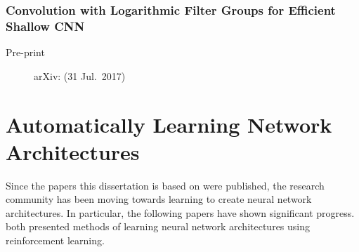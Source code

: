\documentclass[thesis]{subfiles}
\begin{document}
\subsubsection*{Convolution with Logarithmic Filter Groups for Efficient Shallow {CNN}}
\begin{description}
    \item[Pre-print] arXiv: (31 Jul.\ 2017)
\end{description}
\citet{Lee2017}

\section[Automatically Learning Network Architectures]{Automatically Learning Network\texorpdfstring{\\}{ }Architectures}
Since the papers this dissertation is based on were published, the research community has been moving towards learning to create neural network architectures. In particular, the following papers have shown significant progress.
\citet{baker2017, zoph2017} both presented methods of learning neural network architectures using reinforcement learning. 
\end{document}
